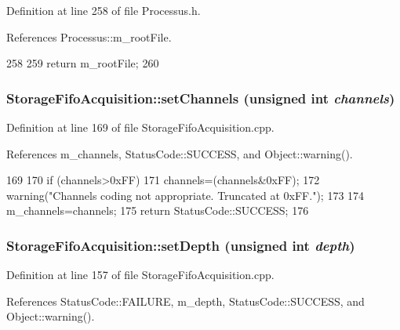 Definition at line 258 of file Processus.h.

References Processus::m\_\-rootFile.


\begin{DoxyCode}
258                      {
259     return m_rootFile;
260   }
\end{DoxyCode}
\hypertarget{classStorageFifoAcquisition_adc27c0b9e7c3e8b35679bf461258769d}{
\subsubsection[{setChannels}]{ StorageFifoAcquisition::setChannels (unsigned int {\em channels})}}
\label{classStorageFifoAcquisition_adc27c0b9e7c3e8b35679bf461258769d}


Definition at line 169 of file StorageFifoAcquisition.cpp.

References m\_\-channels, StatusCode::SUCCESS, and Object::warning().


\begin{DoxyCode}
169                                                                     {
170   if (channels>0xFF){
171     channels=(channels&0xFF);
172     warning("Channels coding not appropriate. Truncated at 0xFF.");
173   }
174   m_channels=channels;
175   return StatusCode::SUCCESS;
176 }
\end{DoxyCode}
\hypertarget{classStorageFifoAcquisition_a34f9ade5de4933552aa7bcfdf6a9c264}{
\subsubsection[{setDepth}]{ StorageFifoAcquisition::setDepth (unsigned int {\em depth})}}
\label{classStorageFifoAcquisition_a34f9ade5de4933552aa7bcfdf6a9c264}


Definition at line 157 of file StorageFifoAcquisition.cpp.

References StatusCode::FAILURE, m\_\-depth, StatusCode::SUCCESS, and Object::warning().


